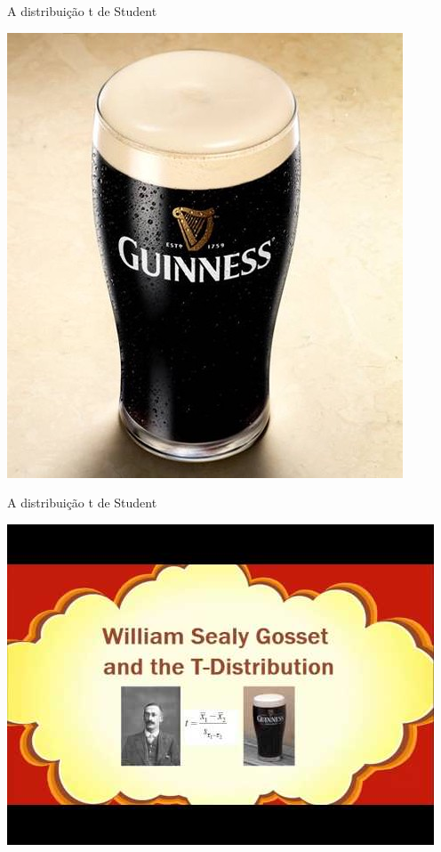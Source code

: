 \documentclass{beamer}
\begin{document}
\begin{frame}{A distribuição t de Student}
  \begin{center}
    \includegraphics[height=\textheight]{Cap5/Guinness}
  \end{center}
\end{frame}

\begin{frame}{A distribuição t de Student}
  \begin{center}
    \includegraphics[height=\textheight]{Cap5/Student-Guinness}
  \end{center}
\end{frame}
\end{document}
